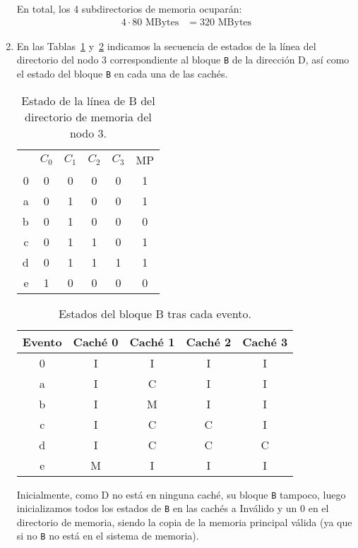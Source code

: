 \begin{ejercicio}
\begin{enumerate}
        En total, los 4 subdirectorios de memoria ocuparán:
        \begin{align*}
            4\cdot 80 \text{\ MBytes} &= 320 \text{\ MBytes}
        \end{align*}

    \item En las Tablas~\ref{tab:ej_rel3_3} y~\ref{tab:ej_rel3_3_2} indicamos la secuencia de estados de la línea del directorio del nodo 3 correspondiente al bloque \verb|B| de la dirección D, así como el estado del bloque \verb|B| en cada una de las cachés.

\begin{table}[H]
\centering
\begin{tabular}{r|c|c|c|c|c|}
    & $C_0$ & $C_1$ & $C_2$ & $C_3$ & MP \\
    \cline{2-6}
    0 & 0 & 0 & 0 & 0 & 1 \\
    \cline{2-6}
    a & 0 & 1 & 0 & 0 & 1 \\
    \cline{2-6}
    b & 0 & 1 & 0 & 0 & 0 \\
    \cline{2-6}
    c & 0 & 1 & 1 & 0 & 1 \\
    \cline{2-6}
    d & 0 & 1 & 1 & 1 & 1 \\
    \cline{2-6}
    e & 1 & 0 & 0 & 0 & 0 \\
    \cline{2-6}
\end{tabular}
\caption{Estado de la línea de B del directorio de memoria del nodo 3.}
\label{tab:ej_rel3_3}
\end{table}

\begin{table}[H]
\centering
\begin{tabular}{c|c|c|c|c}
    Evento & Caché 0 & Caché 1 & Caché 2 & Caché 3 \\
    \hline
    0 & I & I & I & I \\
    \hline
    a & I & C & I & I \\
    \hline
    b & I & M & I & I \\
    \hline
    c & I & C & C & I \\
    \hline
    d & I & C & C & C \\
    \hline
    e & M & I & I & I \\
\end{tabular}
\caption{Estados del bloque B tras cada evento.}
\label{tab:ej_rel3_3_2}
\end{table}
Inicialmente, como D no está en ninguna caché, su bloque \verb|B| tampoco, luego inicializamos todos los estados de \verb|B| en las cachés a Inválido y un 0 en el directorio de memoria, siendo la copia de la memoria principal válida (ya que si no \verb|B| no está en el sistema de memoria).


\end{enumerate}
\end{ejercicio}
